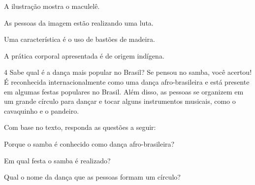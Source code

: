 
\begin{boxlist}
\item A ilustração mostra o maculelê. 

\item As pessoas da imagem estão realizando uma luta. 

\item Uma característica é o uso de bastões de madeira. 

\item A prática corporal apresentada é de origem indígena. 
\end{boxlist}


\num{4} Sabe qual é a dança mais popular no Brasil? Se pensou no samba, você
  acertou! É reconhecida internacionalmente como uma dança
  afro-brasileira e está presente em algumas festas populares no Brasil.
  Além disso, as pessoas se organizem em um grande círculo para dançar e
  tocar alguns instrumentos musicais, como o cavaquinho e o pandeiro.


Com base no texto, responda as questões a seguir:

\begin{escolha}
\item Porque o samba é conhecido como dança afro-brasileira?


\item Em qual festa o samba é realizado?


\item Qual o nome da dança que as pessoas formam um círculo?

\end{escolha}

